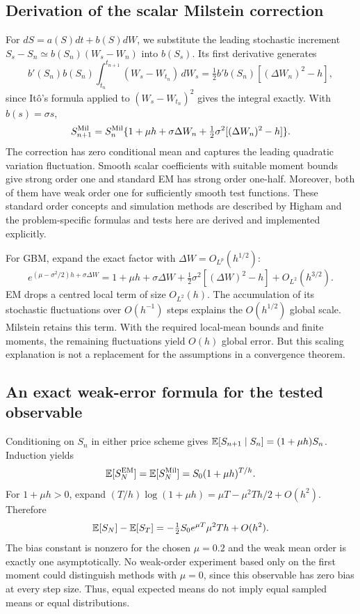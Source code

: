 \subsection{Derivation of the scalar Milstein correction}
For $dS=a(S)dt+b(S)dW$, we substitute the leading stochastic increment $S_s-S_n\simeq b(S_n)(W_s-W_n)$ into $b(S_s)$. Its first derivative generates
\begin{equation}
b'(S_n)b(S_n)\int_{t_n}^{t_{n+1}}(W_s-W_{t_n})\,dW_s
=\tfrac12b'b(S_n)[(\Delta W_n)^2-h],
\end{equation}
since It\^o's formula applied to $(W_s-W_{t_n})^2$ gives the integral exactly. With $b(s)=\sigma s$,
\begin{equation}\label{eq:milstein}
S_{n+1}^{\rm Mil}=S_n^{\rm Mil}\{1+\mu h+\sigma\Delta W_n+\tfrac12\sigma^2[(\Delta W_n)^2-h]\}.
\end{equation}
The correction has zero conditional mean and captures the leading quadratic variation fluctuation. Smooth scalar coefficients with suitable moment bounds give strong order one and standard EM has strong order one-half. Moreover, both of them have weak order one for sufficiently smooth test functions. These standard order concepts and simulation methods are described by Higham \cite{higham} and the problem-specific formulas and tests here are derived and implemented explicitly.

For GBM, expand the exact factor with $\Delta W=O_{L^p}(h^{1/2})$:
\begin{equation}
e^{(\mu-\sigma^2/2)h+\sigma\Delta W}
=1+\mu h+\sigma\Delta W+\tfrac12\sigma^2[(\Delta W)^2-h]+O_{L^2}(h^{3/2}).
\end{equation}
EM drops a centred local term of size $O_{L^2}(h)$. The accumulation of its stochastic fluctuations over $O(h^{-1})$ steps explains the $O(h^{1/2})$ global scale. Milstein retains this term. With the required local-mean bounds and finite moments, the remaining fluctuations yield $O(h)$ global error. But this scaling explanation is not a replacement for the assumptions in a convergence theorem.

\subsection{An exact weak-error formula for the tested observable}
Conditioning on $S_n$ in either price scheme gives $\mathbb E[S_{n+1}\mid S_n]=(1+\mu h)S_n$. Induction yields
\begin{equation}\label{eq:weakexact}
\mathbb E[S_N^{\rm EM}]=\mathbb E[S_N^{\rm Mil}]=S_0(1+\mu h)^{T/h}.
\end{equation}
For $1+\mu h>0$, expand $(T/h)\log(1+\mu h)=\mu T-\mu^2Th/2+O(h^2)$. Therefore
\begin{equation}\label{eq:weakexp}
\mathbb E[S_N]-\mathbb E[S_T]=-\tfrac12S_0e^{\mu T}\mu^2T h+O(h^2).
\end{equation}
The bias constant is nonzero for the chosen $\mu=0.2$ and the weak mean order is exactly one asymptotically. No weak-order experiment based only on the first moment could distinguish methods with $\mu=0$, since this observable has zero bias at every step size. Thus, equal expected means do not imply equal sampled means or equal distributions.

